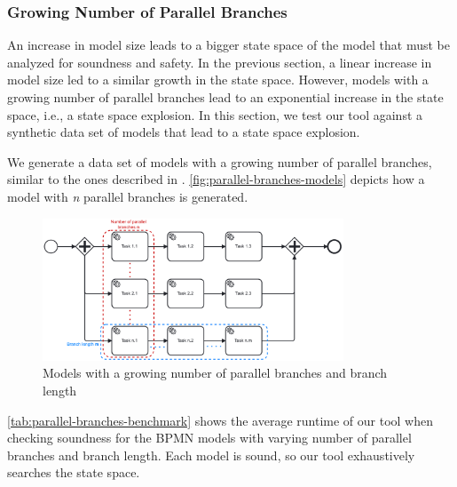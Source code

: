 \documentclass[runningheads]{llncs}
\begin{document}
\subsubsection{Growing Number of Parallel Branches} \label{subsec:degrees-of-parallelism}
An increase in model size leads to a bigger state space of the model that must be analyzed for soundness and safety.
In the previous section, a linear increase in model size led to a similar growth in the state space.
However, models with a growing number of parallel branches lead to an exponential increase in the state space, i.e., a state space explosion.
In this section, we test our tool against a synthetic data set of models that lead to a state space explosion.

We generate a data set of models with a growing number of parallel branches, similar to the ones described in \cite{corradiniFormalApproachAnalysis2021}.
\autoref{fig:parallel-branches-models} depicts how a model with \textit{n} parallel branches is generated.

\begin{figure}[ht]
	\centering
	\includegraphics[width=0.8\textwidth]{images/parallel-branches}
	\caption{Models with a growing number of parallel branches and branch length}
	\label{fig:parallel-branches-models}
\end{figure}


\autoref{tab:parallel-branches-benchmark} shows the average runtime of our tool when checking soundness for the BPMN models with varying number of parallel branches and branch length.
Each model is sound, so our tool exhaustively searches the state space.

\end{document}

